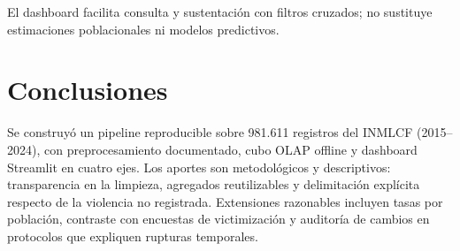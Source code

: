 \documentclass[
	a4paper,
	10pt,
	unnumberedsections,
	twoside,
]{LTJournalArticle}
\begin{document}
El dashboard facilita consulta y sustentaci\'on con filtros cruzados; no sustituye estimaciones poblacionales ni modelos predictivos.

\section{Conclusiones}

Se construy\'o un pipeline reproducible sobre 981.611 registros del INMLCF (2015--2024), con preprocesamiento documentado, cubo OLAP offline y dashboard Streamlit en cuatro ejes.
Los aportes son metodol\'ogicos y descriptivos: transparencia en la limpieza, agregados reutilizables y delimitaci\'on expl\'icita respecto de la violencia no registrada.
Extensiones razonables incluyen tasas por poblaci\'on, contraste con encuestas de victimizaci\'on y auditor\'ia de cambios en protocolos que expliquen rupturas temporales.

\printbibliography
\end{document}
